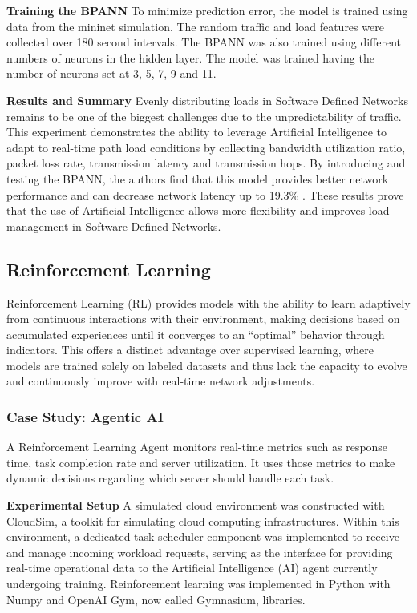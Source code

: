 \documentclass[conference]{IEEEtran}
\begin{document}
\textbf{Training the BPANN}
To minimize prediction error, the model is trained using data from the mininet simulation. The random traffic and load features were collected over 180 second intervals. The BPANN was also trained using different numbers of neurons in the hidden layer. The model was trained having the number of neurons set at 3, 5, 7, 9 and 11.

\textbf{Results and Summary}
Evenly distributing loads in Software Defined Networks remains to be one of the biggest challenges due to the unpredictability of traffic. This experiment demonstrates the ability to leverage Artificial Intelligence to adapt to real-time path load conditions by collecting bandwidth utilization ratio, packet loss rate, transmission latency and transmission hops. By introducing and testing the BPANN, the authors find that this model provides better network performance and can decrease network latency up to 19.3\% \cite{Chen-Xiao_Ya-bin_2016}. These results prove that the use of Artificial Intelligence allows more flexibility and improves load management in Software Defined Networks.

\subsection{Reinforcement Learning}

Reinforcement Learning (RL) provides models with the ability to learn adaptively from continuous interactions with their environment, making decisions based on accumulated experiences until it converges to an ``optimal'' behavior through indicators. This offers a distinct advantage over supervised learning, where models are trained solely on labeled datasets and thus lack the capacity to evolve and continuously improve with real-time network adjustments.

\subsubsection*{Case Study: Agentic AI}

A Reinforcement Learning Agent monitors real-time metrics such as response time, task completion rate and server utilization. It uses those metrics to make dynamic decisions regarding which server should handle each task.

\textbf{Experimental Setup} A simulated cloud environment was constructed with CloudSim, a toolkit for simulating cloud computing infrastructures. Within this environment, a dedicated task scheduler component was implemented to receive and manage incoming workload requests, serving as the interface for providing real-time operational data to the Artificial Intelligence (AI) agent currently undergoing training. Reinforcement learning was implemented in Python with Numpy and OpenAI Gym, now called Gymnasium, libraries.
\end{document}

